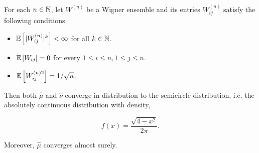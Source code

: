 \begin{theorem}
    For each $n\in \mathbb N$, let $W^{(n)}$ be a Wigner ensemble and its entries $W_{ij}^{(n)}$ satisfy the following conditions.

    \begin{itemize}
        \item $\mathbb E \left[ \lvert W_{ij}^{(n)} \rvert^k \right]<\infty$ for all $k\in \mathbb N$.
        \item $\mathbb E \left[ W_{ij} \right] = 0$ for every $1 \le i \le n, 1 \le j \le n$.
        \item $\mathbb E \left[  W_{ij}^{(n) 2}  \right] = 1/\sqrt{n}$.
    \end{itemize}

    Then both $\hat\mu$ and $\hat\nu$ converge in distribution to the semicircle distribution, i.e. the absolutely continuous distribution with density,

    \begin{equation*}
        f(x) = \frac{\sqrt{4 - x^2}}{2\pi}.
    \end{equation*}

    Moreover, $\hat\mu$ converges almost surely. %
    
\end{theorem}